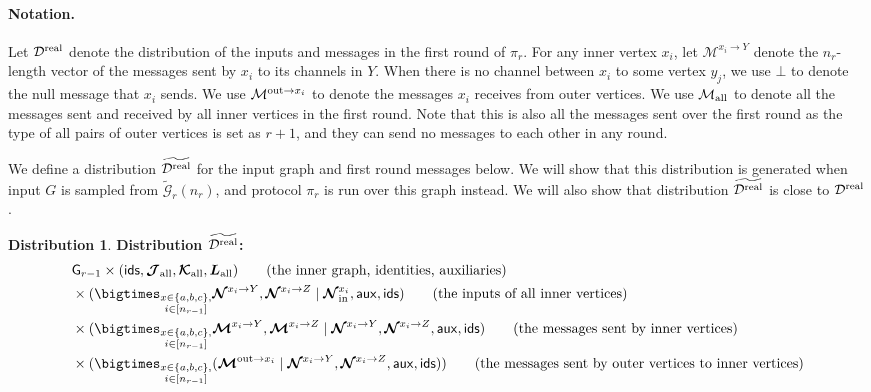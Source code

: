 \documentclass[11pt]{article}
\theoremstyle{definition}
\newtheorem{mddistribution}{Distribution}
\newenvironment{Distribution}{\begin{tbox}\begin{mddistribution}}{\end{mddistribution}\end{tbox}}
\newenvironment{tbox}{\begin{tcolorbox}[
		enlarge top by=5pt,
		enlarge bottom by=5pt,
		 breakable,
		 boxsep=0pt,
                  left=4pt,
                  right=4pt,
                  top=10pt,
                  arc=4pt,
                  boxrule=1pt,toprule=1pt,
                  colback=white
                  ]%
	}
{\end{tcolorbox}}
\newcommand{\rv}[1]{\ensuremath{{\mathsf{#1}}}\xspace}
\newcounter{mybox}
\renewcommand{\themybox}{\arabic{mybox}}
\newcommand{\namethebox}{\begin{center}\textbf{Box~\themybox} \end{center}}
\newcommand{\prot}{\ensuremath{\pi}}
\newcommand{\rNinner}[2]{\ensuremath{\bm{\mathcal{N}}_{\textnormal{in}}^{#1_{#2}}}}
\newcommand{\cD}{\ensuremath{\mathcal{D}}}
\newcommand{\cG}{\ensuremath{\mathcal{G}}}
\newcommand{\cGtil}{\ensuremath{\widetilde{\cG}}}
\newcommand{\cDreal}{\ensuremath{\cD^{\textnormal{real}}}}
\newcommand{\cDrealtil}{\ensuremath{\widetilde{\cDreal}}}
\newcommand{\raux}{\ensuremath{\rv{aux}}}
\newcommand{\rcJall}{\ensuremath{\bm{\mathcal{J}}_{\textnormal{all}}}}
\newcommand{\rcKall}{\ensuremath{\bm{\mathcal{K}}_{\textnormal{all}}}}
\newcommand{\rLall}{\ensuremath{\bm{L}_{\textnormal{all}}}}
\newcommand{\msg}[3]{\ensuremath{\mathcal{M}^{#1_{#3} \to #2}}}
\newcommand{\msgrest}[2]{\ensuremath{\mathcal{M}^{\textnormal{out} \to #1_{#2} }}}
\newcommand{\msgall}{\ensuremath{\mathcal{M}_{\textnormal{all}}}}
\newcommand{\rG}{\ensuremath{\rv{G}}}
\newcommand{\rids}{\ensuremath{\rv{ids}}}
\newcommand{\rNbhood}[3]{\ensuremath{\bm{\mathcal{N}}^{#1_{#3} \to #2}}}
\newcommand{\rmsg}[3]{\ensuremath{\bm{\mathcal{M}}^{#1_{#3} \to #2}}}
\newcommand{\rmsgrest}[2]{\ensuremath{\bm{\mathcal{M}}^{\textnormal{out} \to #1_{#2}}}}
\begin{document}
\paragraph{Notation.}
Let $\cDreal$ denote the distribution of the inputs and messages in the first round of $\prot_r$. For any inner vertex $x_i$, let $\msg{x}{Y}{i}$ denote the $n_r$-length vector of the messages sent by $x_i$ to its channels in $Y$. When there is no channel between $x_i$ to some vertex $y_j$, we use $\bot$ to denote the null message that $x_i$ sends.
We use $\msgrest{x}{i}$ to denote the messages $x_i$ receives from outer vertices. We use $\msgall$ to denote all the messages sent and received by all inner vertices in the first round. Note that this is also all the messages sent over the first round as the type of all pairs of outer vertices is set as $r+1$, and they can send no messages to each other in any round.

We define a distribution $\cDrealtil$ for the input graph and first round messages below. We will show that this distribution is generated when input $G$ is sampled from $\cGtil_r(n_r)$, and protocol $\prot_r$ is run over this graph instead. We will also show that distribution $\cDrealtil$ is close to $\cDreal$. 

\begin{Distribution} \label{box:cDrealtil}
\textbf{Distribution $\cDrealtil$:}
\begin{align*}
	&\rG_{r-1} \times  (\rids, \rcJall, \rcKall, \rLall) \tag{the inner graph, identities, auxiliaries}\\
	&\times (\bigtimes_{\substack{x \in \{a, b, c\}, \\  i \in [n_{r-1}]}} \rNbhood{x}{Y}{i}, \rNbhood{x}{Z}{i} \mid \rNinner{x}{i}, \raux, \rids)  \tag{the inputs of all inner vertices}\\
	&\times (\bigtimes_{\substack{x \in \{a, b, c\}, \\  i \in [n_{r-1}]}} \rmsg{x}{Y}{i}, \rmsg{x}{Z}{i} \mid \rNbhood{x}{Y}{i}, \rNbhood{x}{Z}{i}, \raux, \rids)  \tag{the messages sent by inner vertices}\\
	&\times (\bigtimes_{\substack{x \in \{a, b, c\}, \\  i \in [n_{r-1}]}} (\rmsgrest{x}{i} \mid \rNbhood{x}{Y}{i}, \rNbhood{x}{Z}{i}, \raux, \rids)) \tag{the messages sent by outer vertices to inner vertices}
\end{align*}
\end{Distribution}
\end{document}
